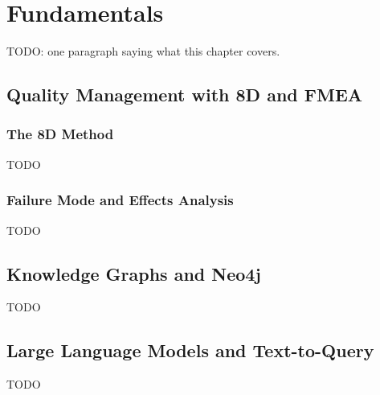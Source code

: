 \chapter{Fundamentals}\label{ch:fundamentals}

TODO: one paragraph saying what this chapter covers.

\section{Quality Management with 8D and FMEA}\label{sec:fund_quality}

\subsection{The 8D Method}\label{subsec:fund_8d}

TODO

\subsection{Failure Mode and Effects Analysis}\label{subsec:fund_fmea}

TODO

\section{Knowledge Graphs and Neo4j}\label{sec:fund_kg}

TODO

\section{Large Language Models and Text-to-Query}\label{sec:fund_llm}

TODO

